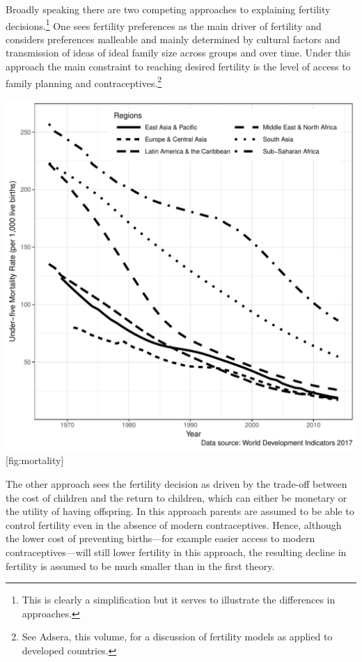 Broadly speaking there are two competing approaches to explaining fertility decisions.\footnote{This is clearly a simplification but it serves to illustrate the differences in approaches.} One sees fertility preferences as the main driver of fertility and considers preferences malleable and mainly determined by cultural factors and transmission of ideas of ideal family size across groups and over time. Under this approach the main constraint to reaching desired fertility is the level of access to family planning and contraceptives.\footnote{See Adsera, this volume, for a discussion of fertility models as applied to developed countries.}

\includegraphics{../figures/childMortalityRatesBW.pdf} {[}fig:mortality{]}

The other approach sees the fertility decision as driven by the trade-off between the cost of children and the return to children, which can either be monetary or the utility of having offspring. In this approach parents are assumed to be able to control fertility even in the absence of modern contraceptives. Hence, although the lower cost of preventing births---for example easier access to modern contraceptives---will still lower fertility in this approach, the resulting decline in fertility is assumed to be much smaller than in the first theory.

